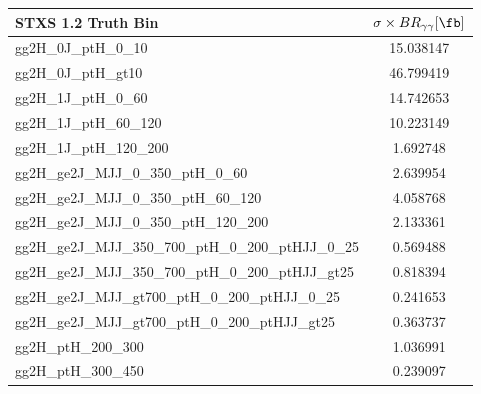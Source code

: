 \begin{table}[htbp]
        \centering
        {\footnotesize
        \begin{tabular}{lS}
                STXS 1.2 Truth Bin                                     & {$\sigma\times BR_{\gamma \gamma} [\si{\fb}]$} \\
                \hline
                gg2H\_0J\_ptH\_0\_10                                   & 15.038147                                    \\
                gg2H\_0J\_ptH\_gt10                                    & 46.799419                                    \\
                gg2H\_1J\_ptH\_0\_60                                   & 14.742653                                    \\
                gg2H\_1J\_ptH\_60\_120                                 & 10.223149                                    \\
                gg2H\_1J\_ptH\_120\_200                                & 1.692748                                     \\
                gg2H\_ge2J\_MJJ\_0\_350\_ptH\_0\_60                    & 2.639954                                     \\
                gg2H\_ge2J\_MJJ\_0\_350\_ptH\_60\_120                  & 4.058768                                     \\
                gg2H\_ge2J\_MJJ\_0\_350\_ptH\_120\_200                 & 2.133361                                     \\
                gg2H\_ge2J\_MJJ\_350\_700\_ptH\_0\_200\_ptHJJ\_0\_25   & 0.569488                                     \\
                gg2H\_ge2J\_MJJ\_350\_700\_ptH\_0\_200\_ptHJJ\_gt25    & 0.818394                                     \\
                gg2H\_ge2J\_MJJ\_gt700\_ptH\_0\_200\_ptHJJ\_0\_25      & 0.241653                                     \\
                gg2H\_ge2J\_MJJ\_gt700\_ptH\_0\_200\_ptHJJ\_gt25       & 0.363737                                     \\
                gg2H\_ptH\_200\_300                                    & 1.036991                                     \\
                gg2H\_ptH\_300\_450                                    & 0.239097                                     \\

\end{tabular}}
\end{table}
